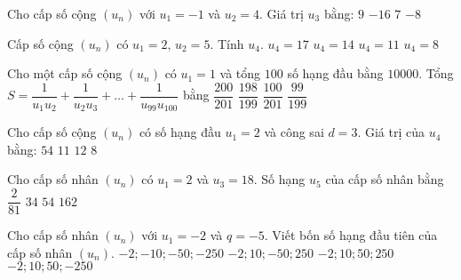 \begin{ex}
Cho cấp số cộng $(u_n)$ với $u_1=-1$ và $u_2=4$. Giá trị $u_3$ bằng:
\choice
{\True $9$}
{$-16$}
{$7$}
{$-8$}
\end{ex}
\begin{ex}
Cấp số cộng $(u_n)$ có $u_1=2$, $u_2=5$. Tính $u_4$.
\choice
{$u_4=17$}
{$u_4=14$}
{\True $u_4=11$}
{$u_4=8$}
\end{ex}
\begin{ex}
Cho một cấp số cộng $(u_n)$ có $u_1=1$ và tổng $100$ số hạng đầu bằng $10000$.
Tổng $S=\dfrac{1}{u_1u_2}+\dfrac{1}{u_2u_3}+ \ldots +\dfrac{1}{u_{99}u_{100}}$ bằng
\choice
{$\dfrac{200}{201}$}
{$\dfrac{198}{199}$}
{$\dfrac{100}{201}$}
{\True $\dfrac{99}{199}$}
\end{ex}
\begin{ex}
Cho cấp số cộng $(u_n)$ có số hạng đầu $u_1=2$ và công sai $d=3$. Giá trị của $u_4$ bằng:
\choice
{$54$}
{\True $11$}
{$12$}
{$8$}
\end{ex}
\begin{ex}
Cho cấp số nhân $(u_n)$ có $u_1=2$ và $u_3=18$. Số hạng $u_5$ của cấp số nhân bằng
\choice
{$\dfrac{2}{81}$}
{$34$}
{$54$}
{\True $162$ }
\end{ex}
\begin{ex}
Cho cấp số nhân $(u_n)$ với $u_1=-2$ và $q=-5$. Viết bốn số hạng đầu tiên của cấp số nhân $(u_n)$.
\choice
{$-2;-10;-50;-250$}
{\True $-2;10;-50;250$}
{$-2;10;50;250$}
{$-2;10;50;-250$}
\end{ex}

